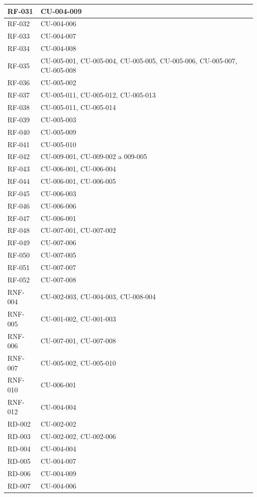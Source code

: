 {\begin{longtable}{|>{\raggedright\arraybackslash}p{2.4cm}|>{\raggedright\arraybackslash}p{12.9cm}|}
RF-031 & CU-004-009 \\ \hline
RF-032 & CU-004-006 \\ \hline
RF-033 & CU-004-007 \\ \hline
RF-034 & CU-004-008 \\ \hline
RF-035 & CU-005-001, CU-005-004, CU-005-005, CU-005-006, CU-005-007, CU-005-008 \\ \hline
RF-036 & CU-005-002 \\ \hline
RF-037 & CU-005-011, CU-005-012, CU-005-013 \\ \hline
RF-038 & CU-005-011, CU-005-014 \\ \hline
RF-039 & CU-005-003 \\ \hline
RF-040 & CU-005-009 \\ \hline
RF-041 & CU-005-010 \\ \hline
RF-042 & CU-009-001, CU-009-002 a 009-005 \\ \hline
RF-043 & CU-006-001, CU-006-004 \\ \hline
RF-044 & CU-006-001, CU-006-005 \\ \hline
RF-045 & CU-006-003 \\ \hline
RF-046 & CU-006-006 \\ \hline
RF-047 & CU-006-001 \\ \hline
RF-048 & CU-007-001, CU-007-002 \\ \hline
RF-049 & CU-007-006 \\ \hline
RF-050 & CU-007-005 \\ \hline
RF-051 & CU-007-007 \\ \hline
RF-052 & CU-007-008 \\ \hline
RNF-004 & CU-002-003, CU-004-003, CU-008-004 \\ \hline
RNF-005 & CU-001-002, CU-001-003 \\ \hline
RNF-006 & CU-007-001, CU-007-008 \\ \hline
RNF-007 & CU-005-002, CU-005-010 \\ \hline
RNF-010 & CU-006-001 \\ \hline
RNF-012 & CU-004-004 \\ \hline
RD-002 & CU-002-002 \\ \hline
RD-003 & CU-002-002, CU-002-006 \\ \hline
RD-004 & CU-004-004 \\ \hline
RD-005 & CU-004-007 \\ \hline
RD-006 & CU-004-009 \\ \hline
RD-007 & CU-004-006 \\ \hline

\end{longtable}}
